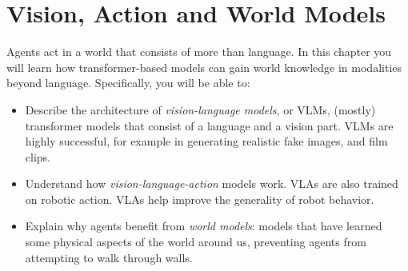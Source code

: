 
\chapter{Vision, Action and World Models}\label{chap:world}

\begin{learningbox}
Agents act in a world that consists of more than language. In this chapter you will learn how  transformer-based models can gain world knowledge in modalities beyond language.
Specifically, you will be able to:
\begin{itemize}[leftmargin=*, nosep]
    \item Describe the architecture of {\em vision-language models}, or VLMs, (mostly) transformer models  that consist of a language and a vision part. VLMs are highly successful, for example in generating realistic fake images, and film clips. 

    \item Understand how {\em vision-language-action} models work. VLAs are also trained on robotic action. VLAs help improve the generality of robot behavior.
    
    \item Explain why agents benefit from {\em world models}: models that have learned some physical aspects of the world around us, preventing  agents from attempting to walk through walls. %
\end{itemize}
\end{learningbox}





